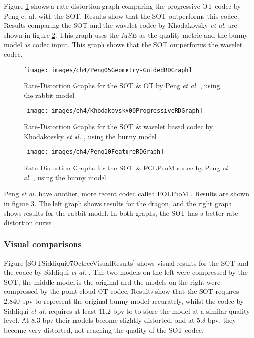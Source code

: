 Figure \ref{Peng05Geometry-GuidedRDGraph} shows a rate-distortion graph comparing the progressive OT codec by Peng et al. \cite{Peng05Geometry-Guided} with the SOT.  Results show that the SOT outperforms this codec. Results comparing the SOT and the wavelet codec by Khodakovsky \textit{et al.} \cite{Khodakovsky00Progressive} are shown in figure \ref{Khodakovsky00ProgressiveRDGraph}. This graph uses the $MSE$ as the quality metric and the bunny model as codec input. This graph shows that the SOT outperforms the wavelet codec.


\begin{figure}[!h]
\centering
\texttt{[image: images/ch4/Peng05Geometry-GuidedRDGraph]}
\caption{Rate-Distortion Graphs for the SOT \& OT by Peng \textit{et al.} \cite{Peng05Geometry-Guided}, using the rabbit model}
\label{Peng05Geometry-GuidedRDGraph}
\end{figure}

\begin{figure}[!h]
\centering
\texttt{[image: images/ch4/Khodakovsky00ProgressiveRDGraph]}
\caption{Rate-Distortion Graphs for the SOT \& wavelet based codec by Khodakovsky \textit{et al.} \cite{Khodakovsky00Progressive}, using the bunny model}
\label{Khodakovsky00ProgressiveRDGraph}
\end{figure}

\begin{figure}[!h]
\centering
\texttt{[image: images/ch4/Peng10FeatureRDGraph]}
\caption{Rate-Distortion Graphs for the SOT \& FOLProM codec by Peng \textit{et al.} \cite{Peng10Feature}, using the bunny model}
\label{Peng10FeatureRDGraph}
\end{figure}

Peng \textit{et al.} have another, more recent codec called FOLProM  \cite{Peng10Feature}. Results are shown in figure \ref{Peng10FeatureRDGraph}. The left graph shows results for the dragon, and the right graph shows results for the rabbit model. In both graphs, the SOT has a better rate-distortion curve.

\subsubsection{Visual comparisons}

Figure \ref{SOTSiddiqui07OctreeVisualResults} shows visual results for the SOT and the codec by Siddiqui \textit{et al.} \cite{Siddiqui07Octree}. The two models on the left were compressed by the SOT, the middle model is the original and the models on the right were compressed by the point cloud OT codec. Results show that the SOT requires $2.840$ bpv to represent the original bunny model accurately, whilst the codec by Siddiqui \textit{et al.} requires at least $11.2$ bpv to to store the model at a similar quality level. At $8.3$ bpv their models become slightly distorted, and at $5.8$ bpv, they become very distorted, not reaching the quality of the SOT codec.
 
